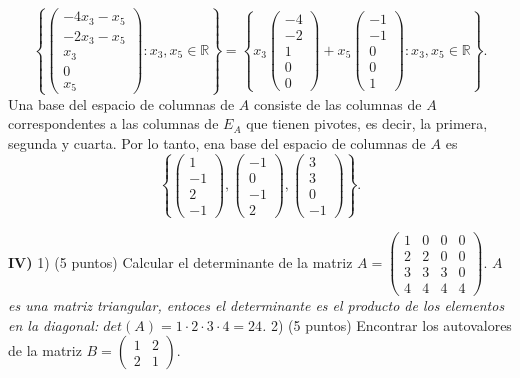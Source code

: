 \documentclass[12pt,a4paper]{amsart}
\newcommand{\pr}[1]{\vspace{0.1cm}\hspace*{0.1cm} \textbf{#1) }}
\newcommand{\RR}{\mathbb{R}} %
\begin{document}
{$$\left\{
\left(\begin{array}{c} -4x_3-x_5\\  -2x_3-x_5\\x_3\\0\\x_5   \end{array}\right): x_3,x_5\in \RR
\right\}=
\left\{x_3
\left(\begin{array}{c} -4\\  -2\\1\\0\\0   \end{array}\right)
+x_5
\left(\begin{array}{c} -1\\  -1\\0\\0\\1   \end{array}\right)
: x_3,x_5\in \RR
\right\}.$$
Una base del espacio de columnas de $A$ consiste de las columnas de $A$ correspondentes a las columnas de $E_A$ que tienen pivotes, es decir, la primera, segunda y cuarta. Por lo tanto, ena base del espacio de columnas de $A$ es 
$$\left\{
\left(\begin{array}{c} 1\\  -1\\2\\-1  \end{array}\right),
\left(\begin{array}{c} -1\\  0\\-1\\2  \end{array}\right),
\left(\begin{array}{c} 3\\  3\\0\\-1  \end{array}\right)\right\}.$$
}

\newpage
 \vskip -1cm
\pr{IV}  
1)  (5 puntos) Calcular el determinante de la matriz
$A=\left(\begin{array}{cccc}1 & 0 & 0 & 0 \\2 & 2 & 0 & 0 \\3 & 3 & 3 & 0 
\\4 & 4 & 4 & 4\end{array}\right).$
\vskip 0.5cm
\emph{
$A$ es una matriz triangular, entoces el determinante es el producto de los elementos en la diagonal: $det(A)=1\cdot2\cdot3\cdot4=24$.
}
\vskip 1cm
2)  (5 puntos) Encontrar los autovalores de la matriz
$B=\left(\begin{array}{cc}1 & 2 \\2 & 1\end{array}\right).$
\end{document}
